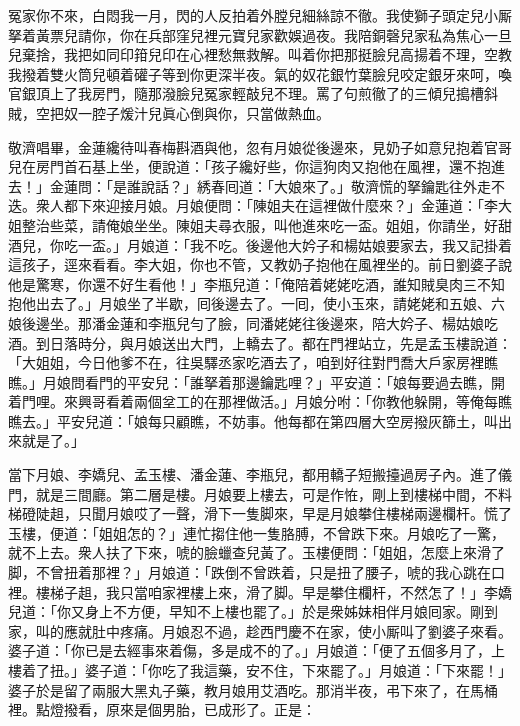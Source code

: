 \begin{myquote} 
冤家你不來，白悶我一月，閃的人反拍着外膛兒細絲諒不徹。我使獅子頭定兒小厮拏着黃票兒請你，你在兵部窪兒裡元寶兒家歡娛過夜。我陪銅磬兒家私為焦心一旦兒棄捨，我把如同印箝兒印在心裡愁無救解。叫着你把那挺臉兒高揚着不理，空教我撥着雙火筒兒頓着礶子等到你更深半夜。氣的奴花銀竹葉臉兒咬定銀牙來呵，喚官銀頂上了我房門，隨那潑臉兒冤家輕敲兒不理。罵了句煎徹了的三傾兒搗槽斜賊，空把奴一腔子煖汁兒眞心倒與你，只當做熱血。
\end{myquote} 

敬濟唱畢，金蓮纔待叫春梅斟酒與他，忽有月娘從後邊來，見奶子如意兒抱着官哥兒在房門首石基上坐，便說道：「孩子纔好些，你這狗肉又抱他在風裡，還不抱進去！」金蓮問：「是誰說話？」綉春囘道：「大娘來了。」敬濟慌的拏鑰匙往外走不迭。衆人都下來迎接月娘。月娘便問：「陳姐夫在這裡做什麼來？」金蓮道：「李大姐整治些菜，請俺娘坐坐。{}陳姐夫尋衣服，叫他進來吃一盃。姐姐，你請坐，好甜酒兒，你吃一盃。」月娘道：「我不吃。後邊他大妗子和楊姑娘要家去，我又記掛着這孩子，逕來看看。李大姐，你也不管，又教奶子抱他在風裡坐的。前日劉婆子說他是驚寒，你還不好生看他！」李瓶兒道：「俺陪着姥姥吃酒，誰知賊臭肉三不知抱他出去了。」月娘坐了半歇，囘後邊去了。一囘，使小玉來，請姥姥和五娘、六娘後邊坐。那潘金蓮和李瓶兒勻了臉，同潘姥姥往後邊來，陪大妗子、楊姑娘吃酒。到日落時分，與月娘送出大門，上轎去了。都在門裡站立，先是孟玉樓說道：「大姐姐，今日他爹不在，往吳驛丞家吃酒去了，咱到好往對門喬大戶家房裡瞧瞧。」月娘問看門的平安兒：「誰拏着那邊鑰匙哩？」平安道：「娘每要過去瞧，開着門哩。來興哥看着兩個坌工的在那裡做活。」月娘分咐：「你教他躲開，等俺每瞧瞧去。」平安兒道：「娘每只顧瞧，不妨事。他每都在第四層大空房撥灰篩土，叫出來就是了。」

當下月娘、李嬌兒、孟玉樓、潘金蓮、李瓶兒，都用轎子短搬擡過房子內。進了儀門，就是三間廳。第二層是樓。月娘要上樓去，可是作恠，剛上到樓梯中間，不料梯磴陡趄，只聞月娘哎了一聲，滑下一隻脚來，早是月娘攀住樓梯兩邊欄杆。慌了玉樓，便道：「姐姐怎的？」連忙搊住他一隻胳膊，不曾跌下來。月娘吃了一驚，就不上去。衆人扶了下來，唬的臉蠟查兒黃了。玉樓便問：「姐姐，怎麼上來滑了脚，不曾扭着那裡？」月娘道：「跌倒不曾跌着，只是扭了腰子，唬的我心跳在口裡。樓梯子趄，我只當咱家裡樓上來，滑了脚。早是攀住欄杆，不然怎了！」李嬌兒道：「你又身上不方便，早知不上樓也罷了。」於是衆姊妹相伴月娘囘家。剛到家，叫的應就肚中疼痛。月娘忍不過，趁西門慶不在家，使小厮叫了劉婆子來看。婆子道：「你已是去經事來着傷，多是成不的了。」月娘道：「便了五個多月了，上樓着了扭。」婆子道：「你吃了我這藥，安不住，下來罷了。」{}月娘道：「下來罷！」婆子於是留了兩服大黑丸子藥，教月娘用艾酒吃。那消半夜，弔下來了，在馬桶裡。點燈撥看，原來是個男胎，已成形了。正是：

